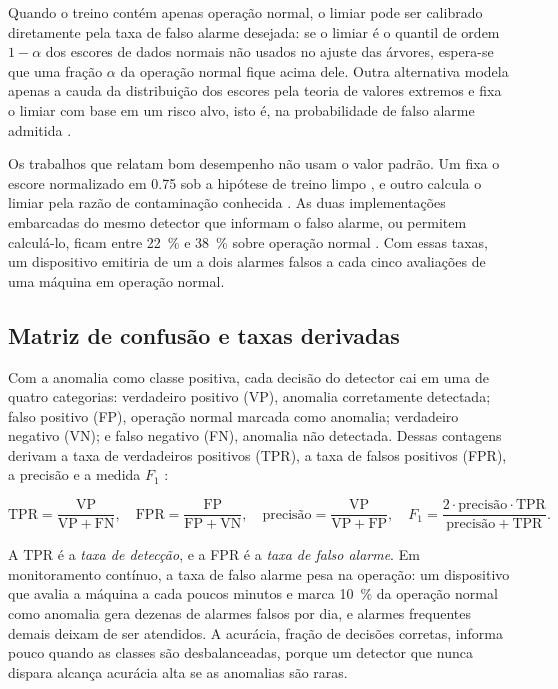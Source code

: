 Quando o treino contém apenas operação normal, o limiar pode ser calibrado diretamente pela taxa de falso alarme desejada: se o limiar é o quantil de ordem $1-\alpha$ dos
escores de dados normais não usados no ajuste das árvores, espera-se que uma fração $\alpha$ da operação normal fique acima dele. Outra alternativa modela apenas a cauda da
distribuição dos escores pela teoria de valores extremos e fixa o limiar com base em um risco alvo, isto é, na probabilidade de falso alarme admitida \cite{siffer2017}.

Os trabalhos que relatam bom desempenho não usam o valor padrão. Um fixa o escore normalizado em \num{0,75} sob a hipótese de treino limpo \cite{antonini2023}, e outro
calcula o limiar pela razão de contaminação conhecida \cite{brito2022}. As duas implementações embarcadas do mesmo detector que informam o falso alarme, ou permitem
calculá-lo, ficam entre \SI{22}{\percent} e \SI{38}{\percent} sobre operação normal \cite{chevtchenko2023,kolok2025}. Com essas taxas, um dispositivo emitiria de um a dois
alarmes falsos a cada cinco avaliações de uma máquina em operação normal.

\subsection{Matriz de confusão e taxas derivadas}

Com a anomalia como classe positiva, cada decisão do detector cai em uma de quatro categorias: verdadeiro positivo (VP), anomalia corretamente detectada; falso positivo (FP),
operação normal marcada como anomalia; verdadeiro negativo (VN); e falso negativo (FN), anomalia não detectada. Dessas contagens derivam a taxa de verdadeiros positivos (TPR),
a taxa de falsos positivos (FPR), a precisão e a medida $F_1$ \cite{fawcett2006}:

\begin{equation}
\mathrm{TPR} = \frac{\mathrm{VP}}{\mathrm{VP} + \mathrm{FN}},
\quad
\mathrm{FPR} = \frac{\mathrm{FP}}{\mathrm{FP} + \mathrm{VN}},
\quad
\text{precisão} = \frac{\mathrm{VP}}{\mathrm{VP} + \mathrm{FP}},
\quad
F_1 = \frac{2\cdot \text{precisão} \cdot \mathrm{TPR}}{\text{precisão} + \mathrm{TPR}}.
\label{eq:fund-taxas}
\end{equation}

A TPR é a \emph{taxa de detecção}, e a FPR é a \emph{taxa de falso alarme}. Em monitoramento contínuo, a taxa de falso alarme pesa na operação: um dispositivo que avalia a máquina a
cada poucos minutos e marca \SI{10}{\percent} da operação normal como anomalia gera dezenas de alarmes falsos por dia, e alarmes frequentes demais deixam de ser atendidos. A acurácia,
fração de decisões corretas, informa pouco quando as classes são desbalanceadas, porque um detector que nunca dispara alcança acurácia alta se as anomalias são raras.

